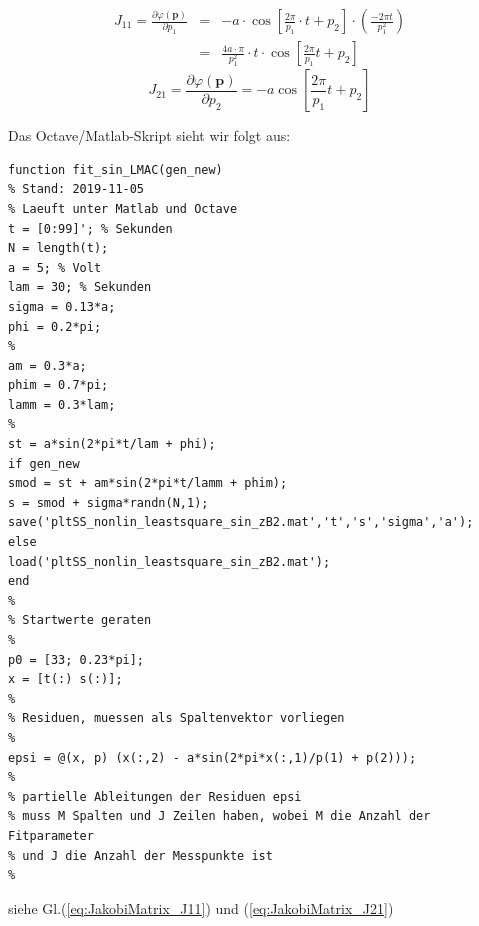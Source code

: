 \begin{eqnarray}
 \nonumber J_{11} = \frac{\partial\varphi(\boldsymbol{p})}{\partial p_1} &=&
	- a\cdot \cos \left[ \frac{2\pi}{p_1} \cdot t +p_2 \right] \cdot
	\left(\frac{-2\pi t}{p_1^2} \right) \\
	&=& \frac{4a\cdot \pi}{p_1^2}\cdot t \cdot \cos \left[\frac{2 \pi}{p_1} t +p_2 \right]
	\label{eq:JakobiMatrix_J11}
\end{eqnarray}
\begin{equation}
	J_{21} = \frac{\partial\varphi(\boldsymbol{p})}{\partial p_2} = - a \cos \left[
	\frac{2 \pi}{p_1} t + p_2 \right]
		\label{eq:JakobiMatrix_J21}
\end{equation}

 Das Octave/Matlab-Skript sieht wir folgt aus:

\begin{lstlisting}[style=Matlab]
function fit_sin_LMAC(gen_new)
% Stand: 2019-11-05
% Laeuft unter Matlab und Octave
t = [0:99]'; % Sekunden
N = length(t);
a = 5; % Volt
lam = 30; % Sekunden
sigma = 0.13*a;
phi = 0.2*pi;
%
am = 0.3*a;
phim = 0.7*pi;
lamm = 0.3*lam;
%
st = a*sin(2*pi*t/lam + phi);
if gen_new
smod = st + am*sin(2*pi*t/lamm + phim);
s = smod + sigma*randn(N,1);
save('pltSS_nonlin_leastsquare_sin_zB2.mat','t','s','sigma','a');
else
load('pltSS_nonlin_leastsquare_sin_zB2.mat');
end
%
% Startwerte geraten
%
p0 = [33; 0.23*pi];
x = [t(:) s(:)];
%
% Residuen, muessen als Spaltenvektor vorliegen
%
epsi = @(x, p) (x(:,2) - a*sin(2*pi*x(:,1)/p(1) + p(2)));
%
% partielle Ableitungen der Residuen epsi
% muss M Spalten und J Zeilen haben, wobei M die Anzahl der Fitparameter
% und J die Anzahl der Messpunkte ist
%
\end{lstlisting}
siehe Gl.(\ref{eq:JakobiMatrix_J11}) und (\ref{eq:JakobiMatrix_J21})
